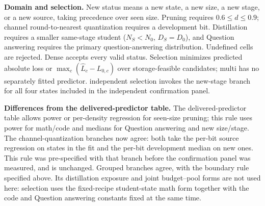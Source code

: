 \par\noindent\textbf{Domain and selection.} New status means a new state, a new size, a new stage, or a new source, taking precedence over seen size. Pruning requires $0.6\le d\le0.9$; channel round-to-nearest quantization requires a development bit. Distillation requires a smaller same-stage student ($N_S<N_0$, $D_S=D_0$), and Question answering requires the primary question-answering distribution. Undefined cells are rejected. Dense accepts every valid status. Selection minimizes predicted absolute loss or $\max_c(\widehat L_c-L_{0,c})$ over storage-feasible candidates; multi has no separately fitted predictor. independent selection invokes the new-stage branch for all four states included in the independent confirmation panel.
\par\noindent\textbf{Differences from the delivered-predictor table.} The delivered-predictor table allows power or per-density regression for seen-size pruning; this rule uses power for math/code and medians for Question answering and new size/stage. The channel-quantization branches now agree: both take the per-bit source regression on states in the fit and the per-bit development median on new ones. This rule was pre-specified with that branch before the confirmation panel was measured, and is unchanged. Grouped branches agree, with the boundary rule specified above. Its distillation exposure and joint budget--pool forms are not used here: selection uses the fixed-recipe student-state math form together with the code and Question answering constants fixed at the same time.
\endgroup
